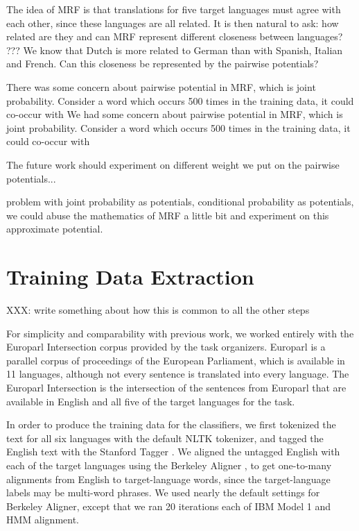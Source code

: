 \documentclass[11pt,letterpaper]{article}
\begin{document}
The idea of MRF is that translations for five target languages must agree with
each other, since these languages are all related.  It is then natural to ask:
how related are they and can MRF represent different closeness between
languages?  ???  We know that Dutch is more related to German than with
Spanish, Italian and French. Can this closeness be represented by the pairwise
potentials?


There was some concern about pairwise potential in MRF, which is joint probability. Consider a word which occurs 500 times in the training data, it could co-occur with
We had some concern about pairwise potential in MRF, which is joint
probability. Consider a word which occurs 500 times in the training data, it
could co-occur with

The future work should experiment on different weight we put on the pairwise
potentials...

problem with joint probability as potentials, conditional probability as
potentials, we could abuse the mathematics of MRF a little bit and experiment
on this approximate potential.


\section{Training Data Extraction}
\label{extraction}

XXX: write something about how this is common to all the other steps

For simplicity and comparability with previous work, we worked entirely with
the Europarl Intersection corpus provided by the task organizers.  Europarl
\cite{europarl} is a parallel corpus of proceedings of the European
Parliament, which is available in 11 languages, although not every sentence is
translated into every language. The Europarl Intersection is the intersection
of the sentences from Europarl that are available in English and all five of
the target languages for the task.

In order to produce the training data for the classifiers, we first tokenized
the text for all six languages with the default NLTK tokenizer,
and tagged the English text with the Stanford Tagger
\cite{Toutanova03feature-richpart-of-speech}. We aligned the untagged English
with each of the target languages using the Berkeley Aligner
\cite{denero-klein:2007:ACLMain}, to get one-to-many alignments from English to
target-language words, since the target-language labels may be multi-word
phrases. We used nearly the default settings for Berkeley Aligner, except
that we ran 20 iterations each of IBM Model 1 and HMM alignment.
\end{document}
